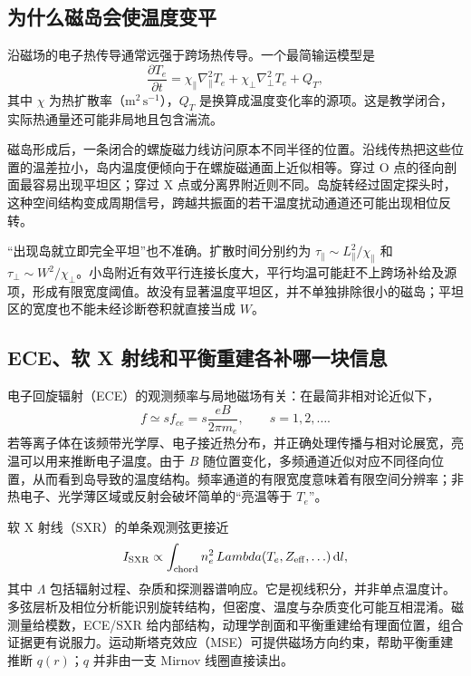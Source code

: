 \subsection{为什么磁岛会使温度变平}

沿磁场的电子热传导通常远强于跨场热传导。一个最简输运模型是
\begin{equation}
 \frac{\partial T_e}{\partial t}
 =\chi_\parallel\nabla_\parallel^2T_e+
   \chi_\perp\nabla_\perp^2T_e+Q_T,
 \label{tm:anisotropic_heat}
\end{equation}
其中 $\chi$ 为热扩散率（$\mathrm{m^2\,s^{-1}}$），$Q_T$ 是换算成温度变化率的源项。这是教学闭合，实际热通量还可能非局地且包含湍流。

磁岛形成后，一条闭合的螺旋磁力线访问原本不同半径的位置。沿线传热把这些位置的温差拉小，岛内温度便倾向于在螺旋磁通面上近似相等。穿过 O 点的径向剖面最容易出现平坦区；穿过 X 点或分离界附近则不同。岛旋转经过固定探头时，这种空间结构变成周期信号，跨越共振面的若干温度扰动通道还可能出现相位反转。

“出现岛就立即完全平坦”也不准确。扩散时间分别约为 $\tau_\parallel\sim L_\parallel^2/\chi_\parallel$ 和 $\tau_\perp\sim W^2/\chi_\perp$。小岛附近有效平行连接长度大，平行均温可能赶不上跨场补给及源项，形成有限宽度阈值。故没有显著温度平坦区，并不单独排除很小的磁岛；平坦区的宽度也不能未经诊断卷积就直接当成 $W$。

\subsection{ECE、软 X 射线和平衡重建各补哪一块信息}

电子回旋辐射（ECE）的观测频率与局地磁场有关：在最简非相对论近似下，
\begin{equation}
 f\simeq s f_{ce}=s\frac{eB}{2\pi m_e},\qquad s=1,2,\ldots .
\end{equation}
若等离子体在该频带光学厚、电子接近热分布，并正确处理传播与相对论展宽，亮温可以用来推断电子温度。由于 $B$ 随位置变化，多频通道近似对应不同径向位置，从而看到岛导致的温度结构。频率通道的有限宽度意味着有限空间分辨率；非热电子、光学薄区域或反射会破坏简单的“亮温等于 $T_e$”。

软 X 射线（SXR）的单条观测弦更接近
\begin{equation}
 I_{\rm SXR}\propto\int_{\rm chord} n_e^2\,Lambda(T_e,Z_{\rm eff},\ldots)\,\mathrm d l,
\end{equation}
其中 $\Lambda$ 包括辐射过程、杂质和探测器谱响应。它是视线积分，并非单点温度计。多弦层析及相位分析能识别旋转结构，但密度、温度与杂质变化可能互相混淆。磁测量给模数，ECE/SXR 给内部结构，动理学剖面和平衡重建给有理面位置，组合证据更有说服力。运动斯塔克效应（MSE）可提供磁场方向约束，帮助平衡重建推断 $q(r)$；$q$ 并非由一支 Mirnov 线圈直接读出。

